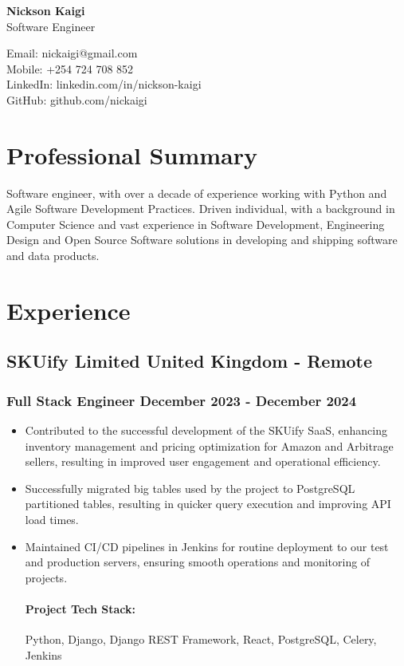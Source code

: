 \documentclass[11pt]{article} %
\begin{document}
\begin{center}
    \begin{minipage}{0.5\textwidth}
    {\Huge\bfseries
        Nickson Kaigi
        } \\ \medskip
        Software Engineer
    \end{minipage} \hfill
    \begin{minipage}{0.4\textwidth}
        \raggedleft
        Email: nickaigi@gmail.com \\
        Mobile: +254 724 708 852 \\
        LinkedIn: linkedin.com/in/nickson-kaigi \\
        GitHub: github.com/nickaigi
    \end{minipage}
\end{center}

\section{Professional Summary}
Software engineer, with over a decade of experience working with Python and Agile Software Development Practices. Driven individual, with a background in Computer Science and vast experience in Software Development, Engineering Design and Open Source Software solutions in developing and shipping software and data products.

\section{Experience}
\subsection{SKUify Limited \hfill United Kingdom - Remote}
\subsubsection{Full Stack Engineer \hfill  December 2023 - December 2024}
\begin{itemize}
    \item Contributed to the successful development of the SKUify SaaS, enhancing inventory management and pricing optimization for Amazon and Arbitrage sellers, resulting in improved user engagement and operational efficiency.
    \item Successfully migrated big tables used by the project to PostgreSQL partitioned tables, resulting in quicker query execution and improving API load times.
    \item Maintained CI/CD pipelines in Jenkins for routine deployment to our test and production servers, ensuring smooth operations and monitoring of projects.

    \paragraph{Project Tech Stack:} Python, Django, Django REST Framework, React, PostgreSQL, Celery, Jenkins
\end{itemize}
\end{document}
